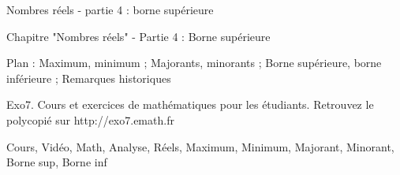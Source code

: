 
Nombres réels - partie 4 : borne supérieure



Chapitre "Nombres réels" - Partie 4 : Borne supérieure

Plan : Maximum, minimum ; Majorants, minorants ;
Borne supérieure, borne inférieure ; Remarques historiques

Exo7. Cours et exercices de mathématiques pour les étudiants.
Retrouvez le polycopié sur http://exo7.emath.fr


Cours, Vidéo, Math, Analyse, Réels, Maximum, Minimum, Majorant, Minorant, Borne sup, Borne inf



